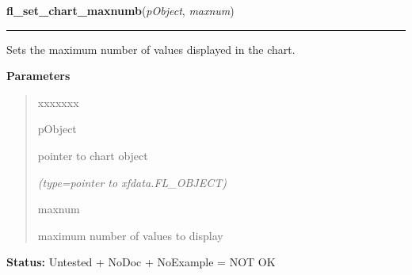 \hspace{.8\funcindent}\begin{boxedminipage}{\funcwidth}

    \raggedright \textbf{fl\_set\_chart\_maxnumb}(\textit{pObject}, \textit{maxnum})

    \vspace{-1.5ex}

    \rule{\textwidth}{0.5\fboxrule}
\setlength{\parskip}{2ex}
    Sets the maximum number of values displayed in the chart.

\setlength{\parskip}{1ex}
      \textbf{Parameters}
      \vspace{-1ex}

      \begin{quote}
        \begin{Ventry}{xxxxxxx}

          \item[pObject]

          pointer to chart object

            {\it (type=pointer to xfdata.FL\_OBJECT)}

          \item[maxnum]

          maximum number of values to display

        \end{Ventry}

      \end{quote}

\textbf{Status:} Untested + NoDoc + NoExample = NOT OK



    \end{boxedminipage}

    \label{xformslib:library:fl_set_chart_autosize}

    \vspace{0.5ex}

